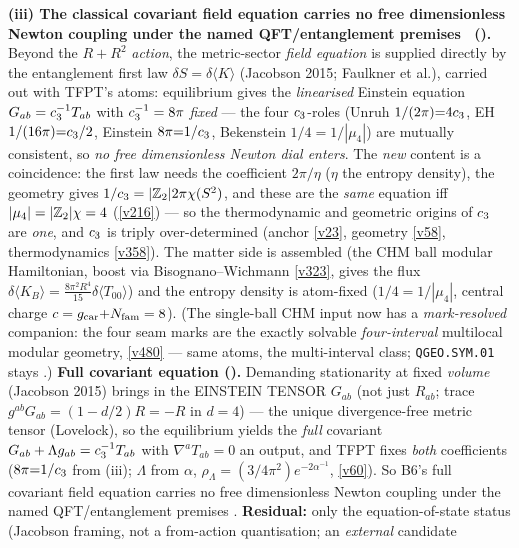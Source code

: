 \begin{keybox}
\textbf{(iii) The classical covariant field equation carries no free dimensionless Newton coupling under the named QFT/entanglement premises \mC\ ().} Beyond
the $R{+}R^2$ \emph{action}, the metric-sector \emph{field equation} is supplied directly by the entanglement first
law $\delta S=\delta\langle K\rangle$ (Jacobson 2015; Faulkner et al.), carried out with TFPT's atoms: equilibrium
gives the \emph{linearised} Einstein equation $G_{ab}=c_3^{-1}T_{ab}$ with $c_3^{-1}=8\pi$ \emph{fixed} ---
the four $c_3$-roles (Unruh $1/(2\pi){=}4c_3$, EH $1/(16\pi){=}c_3/2$, Einstein $8\pi{=}1/c_3$,
Bekenstein $1/4{=}1/|\mu_4|$) are mutually consistent, so \emph{no free dimensionless Newton dial enters}. The
\emph{new} content is a coincidence: the first law needs the coefficient $2\pi/\eta$ ($\eta$ the entropy density),
the geometry gives $1/c_3=|\mathbb{Z}_2|2\pi\chi(S^2)$, and these are the \emph{same} equation iff $|\mu_4|=|\mathbb{Z}_2|\chi=4$
(\vref{v216}) --- so the thermodynamic and geometric origins of $c_3$ are \emph{one}, and $c_3$ is triply
over-determined (anchor \vref{v23}, geometry \vref{v58}, thermodynamics \vref{v358}). The matter side is assembled
(the CHM ball modular Hamiltonian, boost via Bisognano--Wichmann \vref{v323}, gives the flux
$\delta\langle K_B\rangle=\tfrac{8\pi^2R^4}{15}\delta\langle T_{00}\rangle$) and the entropy density is atom-fixed
($1/4{=}1/|\mu_4|$, central charge $c=g_{\mathrm{car}}{+}N_{\mathrm{fam}}=8$). (The single-ball CHM input now has a
\emph{mark-resolved} companion: the four seam marks are the exactly solvable \emph{four-interval} multilocal
modular geometry, \vref{v480} --- same atoms, the multi-interval class; \texttt{QGEO.SYM.01} stays \mO.) \textbf{Full covariant equation
().} Demanding stationarity at fixed \emph{volume} (Jacobson 2015) brings in
the EINSTEIN TENSOR $G_{ab}$ (not just $R_{ab}$; trace $g^{ab}G_{ab}=(1-d/2)R=-R$ in $d{=}4$) --- the unique
divergence-free metric tensor (Lovelock), so the equilibrium yields the \emph{full} covariant
$G_{ab}+\Lambda g_{ab}=c_3^{-1}T_{ab}$ with $\nabla^aT_{ab}{=}0$ an output, and TFPT fixes \emph{both}
coefficients ($8\pi{=}1/c_3$ from (iii); $\Lambda$ from $\alpha$, $\rho_\Lambda=(3/4\pi^2)e^{-2\alpha^{-1}}$,
\vref{v60}). So B6's full covariant field equation carries no free dimensionless Newton coupling under the named QFT/entanglement premises \mC. \textbf{Residual:}
only the equation-of-state status (Jacobson framing, not a from-action quantisation; an \emph{external} candidate

\end{keybox}
